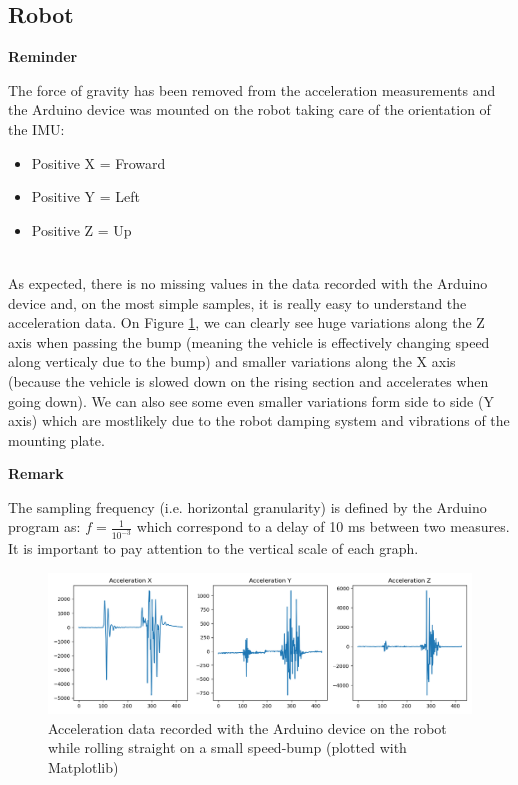 \subsection{Robot}

\noindent
\begin{minipage}[!hc]{0.12\textwidth}
   \textbf{Reminder}
\end{minipage}
\vrule\enskip\vrule\quad\begin{minipage}{\dimexpr 0.87\textwidth-0.8pt-1.5em}
The force of gravity has been removed from the acceleration measurements and the Arduino device was mounted on the robot taking care of the orientation of the IMU:
\begin{itemize}
    \item Positive X = Froward
    \item Positive Y = Left
    \item Positive Z = Up
\end{itemize}
\end{minipage}
\\
As expected, there is no missing values in the data recorded with the Arduino device and, on the most simple samples, it is really easy to understand the acceleration data. On Figure \ref{bump_1}, we can clearly see huge variations along the Z axis when passing the bump (meaning the vehicle is effectively changing speed along verticaly due to the bump) and smaller variations along the X axis (because the vehicle is slowed down on the rising section and accelerates when going down). We can also see some even smaller variations form side to side (Y axis) which are mostlikely due to the robot damping system and vibrations of the mounting plate.\\

\noindent
\begin{minipage}[!hc]{0.12\textwidth}
   \textbf{Remark}
\end{minipage}
\vrule\enskip\vrule\quad\begin{minipage}{\dimexpr 0.87\textwidth-0.8pt-1.5em}
The sampling frequency (i.e. horizontal granularity) is defined by the Arduino program as: \(f = \frac{1}{10^{-3}}\) which correspond to a delay of 10 ms between two measures.\\
It is important to pay attention to the vertical scale of each graph.
\end{minipage}

\begin{figure}
    \center
    \includegraphics[scale=0.5]{img/DATA1.png}
    \caption{Acceleration data recorded with the Arduino device on the robot while rolling straight on a small speed-bump (plotted with Matplotlib)}
    \label{bump_1}
\end{figure}

